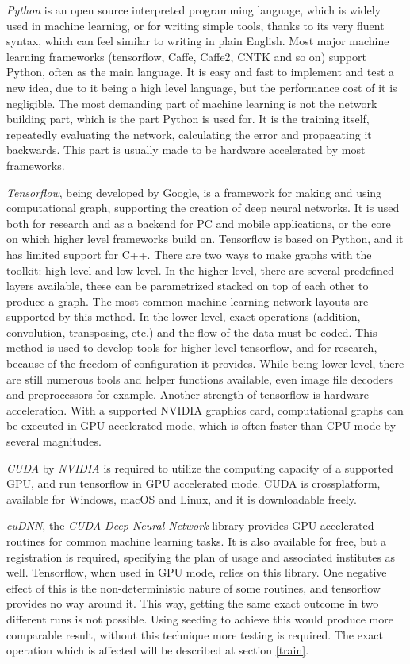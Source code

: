 \documentclass[12pt]{report}
\begin{document}
\textit{Python} is an open source interpreted programming language, which is widely used in machine learning, or for writing simple tools, thanks to its very fluent syntax, which can feel similar to writing in plain English. Most major machine learning frameworks (tensorflow, Caffe, Caffe2, CNTK and so on) support Python, often as the main language. It is easy and fast to implement and test a new idea, due to it being a high level language, but the performance cost of it is negligible. The most demanding part of machine learning is not the network building part, which is the part Python is used for. It is the training itself, repeatedly evaluating the network, calculating the error and propagating it backwards. This part is usually made to be hardware accelerated by most frameworks.\par

\textit{Tensorflow}, being developed by Google, is a framework for making and using computational graph, supporting the creation of deep neural networks. It is used both for research and as a backend for PC and mobile applications, or the core on which higher level frameworks build on. Tensorflow is based on Python, and it has limited support for C++. There are two ways to make graphs with the toolkit: high level and low level. In the higher level, there are several predefined layers available, these can be parametrized stacked on top of each other to produce a graph. The most common machine learning network layouts are supported by this method. In the lower level, exact operations (addition, convolution, transposing, etc.) and the flow of the data must be coded. This method is used to develop tools for higher level tensorflow, and for research, because of the freedom of configuration it provides. While being lower level, there are still numerous tools and helper functions available, even image file decoders and preprocessors for example. Another strength of tensorflow is hardware acceleration. With a supported NVIDIA graphics card, computational graphs can be executed in GPU accelerated mode, which is often faster than CPU mode by several magnitudes.\par

\textit{CUDA} by \textit{NVIDIA} is required to utilize the computing capacity of a supported GPU, and run tensorflow in GPU accelerated mode. CUDA is crossplatform, available for Windows, macOS and Linux, and it is downloadable freely.\par

\label{cudnn}
\textit{cuDNN}, the \textit{CUDA Deep Neural Network} library provides GPU-accelerated routines for common machine learning tasks. It is also available for free, but a registration is required, specifying the plan of usage and associated institutes as well. Tensorflow, when used in GPU mode, relies on this library. One negative effect of this is the non-deterministic nature of some routines, and tensorflow provides no way around it. This way, getting the same exact outcome in two different runs is not possible. Using seeding to achieve this would produce more comparable result, without this technique more testing is required. The exact operation which is affected will be described at section \ref{train}.
\end{document}
